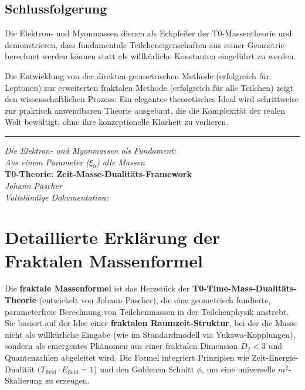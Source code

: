 	\subsection{Schlussfolgerung}
	
	Die Elektron- und Myonmassen dienen als Eckpfeiler der T0-Massentheorie und demonstrieren, dass fundamentale Teilcheneigenschaften aus reiner Geometrie berechnet werden können statt als willkürliche Konstanten eingeführt zu werden.
	
	Die Entwicklung von der direkten geometrischen Methode (erfolgreich für Leptonen) zur erweiterten fraktalen Methode (erfolgreich für alle Teilchen) zeigt den wissenschaftlichen Prozess: Ein elegantes theoretisches Ideal wird schrittweise zur praktisch anwendbaren Theorie ausgebaut, die die Komplexität der realen Welt bewältigt, ohne ihre konzeptionelle Klarheit zu verlieren.
	
	\begin{center}
		\hrule
		\vspace{0.5cm}
		\textit{Die Elektron- und Myonmassen als Fundament:}\\
		\textit{Aus einem Parameter ($\xi_0$) alle Massen}\\
		\vspace{0.3cm}
		\textbf{T0-Theorie: Zeit-Masse-Dualitäts-Framework}\\
		\textit{Johann Pascher}\\
		\vspace{0.3cm}
		\textit{Vollständige Dokumentation:}\\
		
	\end{center}
	
	\appendix
	
	\section{Detaillierte Erklärung der Fraktalen Massenformel}
	
	Die \textbf{fraktale Massenformel} ist das Herzstück der \textbf{T0-Time-Mass-Dualitäts-Theorie} (entwickelt von Johann Pascher), die eine geometrisch fundierte, parameterfreie Berechnung von Teilchenmassen in der Teilchenphysik anstrebt. Sie basiert auf der Idee einer \textbf{fraktalen Raumzeit-Struktur}, bei der die Masse nicht als willkürliche Eingabe (wie im Standardmodell via Yukawa-Kopplungen), sondern als emergentes Phänomen aus einer fraktalen Dimension $D_f < 3$ und Quantenzahlen abgeleitet wird. Die Formel integriert Prinzipien wie Zeit-Energie-Dualität ($T_{\text{field}} \cdot E_{\text{field}} = 1$) und den Goldenen Schnitt $\phi$, um eine universelle $m^2$-Skalierung zu erzeugen.
	
